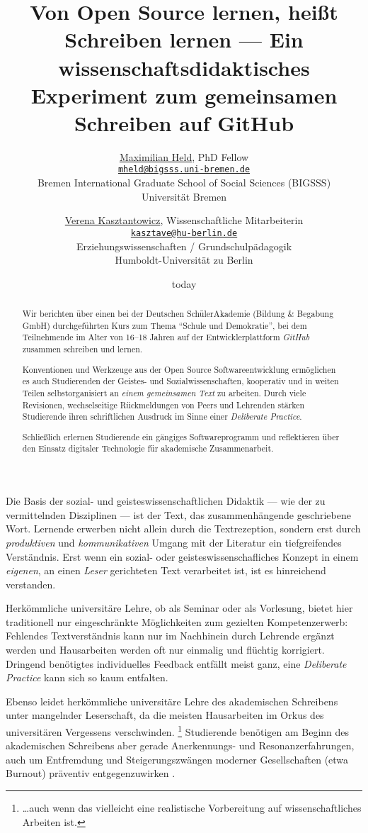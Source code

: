 \documentclass
	[
		11pt,
		a4paper,
		oneside,
		ngerman
	]
	{article}
\title{
	Von Open Source lernen, heißt Schreiben lernen ---
	Ein wissenschaftsdidaktisches Experiment zum gemeinsamen Schreiben auf GitHub
}
\date{today}
\author{
	\href{http://www.maxheld.de}{Maximilian Held}, PhD Fellow\\
	\href{mailto:mheld@bigsss.uni-bremen.de}{\texttt{mheld@bigsss.uni-bremen.de}}\\
	Bremen International Graduate School of Social Sciences (BIGSSS)\\
	Universität Bremen
	\and
	\href{https://www.erziehungswissenschaften.hu-berlin.de/grundschulpaed/mitarbeiterinnen/lb-deutsch/v.-kasztantowicz}{Verena Kasztantowicz}, Wissenschaftliche Mitarbeiterin\\
	\href{mailto:kasztave@hu-berlin.de}{\texttt{kasztave@hu-berlin.de}}\\
	Erziehungswissenschaften / Grundschulpädagogik \\
	Humboldt-Universität zu Berlin
}
\begin{document}
\maketitle

\begin{abstract}
	Wir berichten über einen bei der Deutschen SchülerAkademie (Bildung \& Begabung GmbH) durchgeführten Kurs zum Thema ``Schule und Demokratie'', bei dem Teilnehmende im Alter von 16--18 Jahren auf der Entwicklerplattform \emph{GitHub} zusammen schreiben und lernen.

	Konventionen und Werkzeuge aus der Open Source Softwareentwicklung ermöglichen es auch Studierenden der Geistes- und Sozialwissenschaften, kooperativ und in weiten Teilen selbstorganisiert an \emph{einem gemeinsamen Text} zu arbeiten.
	Durch viele Revisionen, wechselseitige Rückmeldungen von Peers und Lehrenden stärken Studierende ihren schriftlichen Ausdruck im Sinne einer \emph{Deliberate Practice}.

	Schließlich erlernen Studierende ein gängiges Softwareprogramm und reflektieren über den Einsatz digitaler Technologie für akademische Zusammenarbeit.
\end{abstract}

Die Basis der sozial- und geisteswissenschaftlichen Didaktik --- wie der zu vermittelnden Disziplinen --- ist der Text, das zusammenhängende geschriebene Wort.
Lernende erwerben nicht allein durch die Textrezeption, sondern erst durch \emph{produktiven} und \emph{kommunikativen} Umgang mit der Literatur ein tiefgreifendes Verständnis.
Erst wenn ein sozial- oder geisteswissenschafliches Konzept in einem \emph{eigenen}, an einen \emph{Leser} gerichteten Text verarbeitet ist, ist es hinreichend verstanden.

Herkömmliche universitäre Lehre, ob als Seminar oder als Vorlesung, bietet hier traditionell nur eingeschränkte Möglichkeiten zum gezielten Kompetenzerwerb: Fehlendes Textverständnis kann nur im Nachhinein durch Lehrende ergänzt werden und Hausarbeiten werden oft nur einmalig und flüchtig korrigiert.
Dringend benötigtes individuelles Feedback entfällt meist ganz, eine \emph{Deliberate Practice} \parencite{Ericsson2007} kann sich so kaum entfalten.

Ebenso leidet herkömmliche universitäre Lehre des akademischen Schreibens unter mangelnder Leserschaft, da die meisten Hausarbeiten im Orkus des universitären Vergessens verschwinden.
\footnote{
	\ldots auch wenn das vielleicht eine realistische Vorbereitung auf wissenschaftliches Arbeiten ist.
}
Studierende benötigen am Beginn des akademischen Schreibens aber gerade Anerkennungs- und Resonanzerfahrungen, auch um Entfremdung und Steigerungszwängen moderner Gesell\-schaften (etwa Burnout) präventiv entgegenzuwirken \parencite{Rosa-Paech-etal-2014}.
\end{document}
